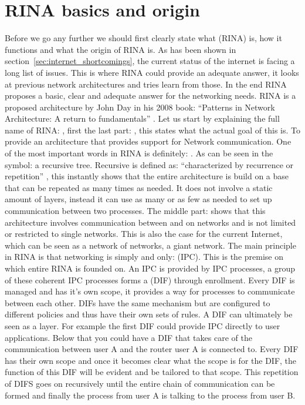 \section{RINA basics and origin}
\label{sec:RINAbasics}
Before we go any further we should first clearly state what  (RINA) is, how it functions and what the origin of RINA is. As has been shown in section~\ref{sec:internet_shortcomings}, the current status of the internet is facing a long list of issues. This is where RINA could provide an adequate answer, it looks at previous network architectures and tries learn from those. In the end RINA proposes a basic, clear and adequate answer for the networking needs.
\npar
RINA is a proposed architecture by John Day in his 2008 book: ``Patterns in Network Architecture: A return to fundamentals'' \citep{johnday2008}. 
Let us start by explaining the full name of RINA: , first the last part: , this states what the actual goal of this is. To provide an architecture that provides support for Network communication. One of the most important words in RINA is definitely: . As can be seen in the  symbol: a recursive tree. Recursive is defined as: ``characterized by recurrence or repetition'' \citep{website:recursive_definition}, 
this instantly shows that the entire architecture is build on a base that can be repeated as many times as needed. It does not involve a static amount of layers, instead it can use as many or as few as needed to set up communication between two processes. The middle part:  shows that this architecture involves communication between and on networks and is not limited or restricted to single networks. This is also the case for the current Internet, which can be seen as a network of networks, a giant network.
\npar
The main principle in RINA is that networking is simply and only:  (IPC). This is the premise on which entire RINA is founded on. An IPC is provided by IPC processes, a group of these coherent IPC processes forms a  (DIF) through enrollment. Every DIF is managed and has it's own scope, it provides a way for processes to communicate between each other. DIFs have the same mechanism but are configured to different policies and thus have their own sets of rules. A DIF can ultimately be seen as a layer. For example the first DIF could provide IPC directly to user applications. Below that you could have a DIF that takes care of the communication between user A and the router user A is connected to. Every DIF has their own scope and once it becomes clear what the scope is for the DIF, the function of this DIF will be evident and be tailored to that scope. This repetition of DIFS goes on recursively until the entire chain of communication can be formed and finally the process from user A is talking to the process from user B.
